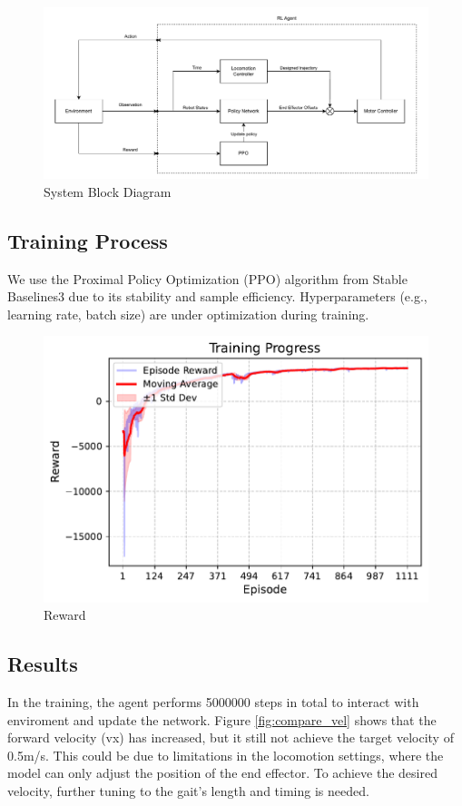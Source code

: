 \documentclass[a4paper,11pt]{article}
\begin{document}
\begin{figure}[H]
  \centering
	\includegraphics[width=0.9\linewidth]{../../assets/system_diagram.pdf}
  \caption{System Block Diagram}
  \label{fig:system}
\end{figure}

\subsection{Training Process}

We use the Proximal Policy Optimization (PPO) algorithm from Stable Baselines3 due to its stability and sample efficiency.
Hyperparameters (e.g., learning rate, batch size) are under optimization during training.

\begin{figure}[H]
  \centering
	\includegraphics[width=0.5\linewidth]{../../assets/rl_training_progress.pdf}
  \caption{Reward}
  \label{fig:reward}
\end{figure}

\subsection{Results}

In the training, the agent performs 5000000 steps in total to interact with enviroment and update the network. 
Figure \ref{fig:compare_vel} shows that the forward velocity (vx) has increased, but it still not achieve the target velocity of 0.5m/s.
This could be due to limitations in the locomotion settings, where the model can only adjust the position of the end effector. To achieve the desired velocity, 
further tuning to the gait's length and timing is needed.
\end{document}

